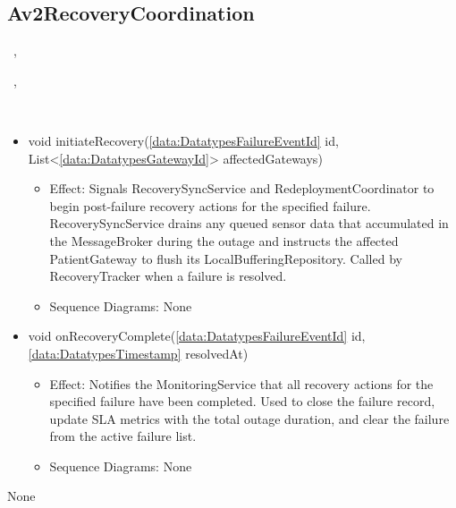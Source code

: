   \subsection{Av2RecoveryCoordination}\label{int:InterfacesAv2RecoveryCoordination}
    \begin{description}
      \item[Provided by:] \iconcomponent{}~, \iconcomponent{}~
      \item[Required by:] \iconcomponent{}~, \iconcomponent{}~ 
      \item[Operations:] ~
    \begin{itemize}[noitemsep,nolistsep,leftmargin=-.25cm]
      \item \textsf{void initiateRecovery(\ref{data:DatatypesFailureEventId} id, List\textless{}\ref{data:DatatypesGatewayId}\textgreater{} affectedGateways)}
        \begin{itemize}[noitemsep,nolistsep]
           \item Effect: Signals RecoverySyncService and RedeploymentCoordinator to begin post-failure recovery actions for the specified failure. RecoverySyncService drains any queued sensor data that accumulated in the MessageBroker during the outage and instructs the affected PatientGateway to flush its LocalBufferingRepository. Called by RecoveryTracker when a failure is resolved. 
           \item Sequence Diagrams: None
        \end{itemize}
      \item \textsf{void onRecoveryComplete(\ref{data:DatatypesFailureEventId} id, \ref{data:DatatypesTimestamp} resolvedAt)}
        \begin{itemize}[noitemsep,nolistsep]
           \item Effect: Notifies the MonitoringService that all recovery actions for the specified failure have been completed. Used to close the failure record, update SLA metrics with the total outage duration, and clear the failure from the active failure list. 
           \item Sequence Diagrams: None
        \end{itemize}
    \end{itemize}
      \item[Diagrams:] None
    \end{description}

